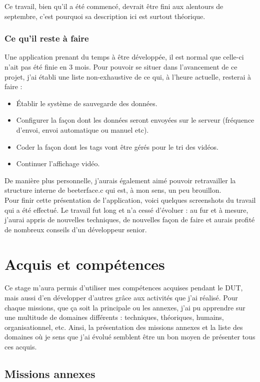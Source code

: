 \documentclass[11pt,french,a4paper]{report}
\begin{document}
Ce travail, bien qu'il a été commencé, devrait être fini aux alentours de septembre, c'est pourquoi sa description ici
est surtout théorique. \\
        \subsection{Ce qu'il reste à faire}
Une application prenant du temps à être développée, il est normal que celle-ci n'ait pas été finie en 3 mois. Pour pouvoir se situer
dans l'avancement de ce projet, j'ai établi une liste non-exhaustive de ce qui, à l'heure actuelle, resterai à faire : \\ 
\begin{itemize}
    \item Établir le système de sauvegarde des données.
    \item Configurer la façon dont les données seront envoyées sur le serveur (fréquence d'envoi, envoi automatique ou manuel etc).
    \item Coder la façon dont les tags vont être gérés pour le tri des vidéos. 
    \item Continuer l'affichage vidéo.
\end{itemize} 
De manière plus personnelle, j'aurais également aimé pouvoir retravailler la structure interne de beeterface.c qui est, à mon sens,
un peu brouillon. \\
Pour finir cette présentation de l'application, voici quelques screenshots du travail qui a été effectué.
Le travail fut long et n'a cessé d'évoluer : au fur et à mesure, j'aurai appris de nouvelles techniques, de nouvelles façon de faire 
et aurais profité de nombreux conseils d'un développeur senior. \\

\chapter{Acquis et compétences}
Ce stage m'aura permis d'utiliser mes compétences acquises pendant le DUT, mais aussi d'en développer d'autres grâce aux activités 
que j'ai réalisé. Pour chaque missions, que ça soit la principale ou les annexes, j'ai pu apprendre sur une multitude de domaines
différents : techniques, théoriques, humains, organisationnel, etc. 
Ainsi, la présentation des missions annexes et la liste des domaines où je sens que j'ai évolué semblent être un bon moyen 
de présenter tous ces acquis. 
\section{Missions annexes}
        
\end{document}

